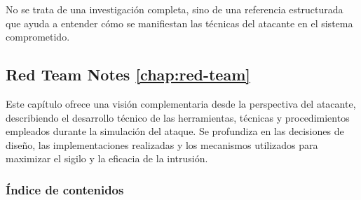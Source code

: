 No se trata de una investigación completa, sino de una referencia estructurada que ayuda a entender cómo se manifiestan las técnicas del atacante en el sistema comprometido.

\subsection{Red Team Notes \ref{chap:red-team}}
Este capítulo ofrece una visión complementaria desde la perspectiva del atacante, describiendo el desarrollo técnico de las herramientas, técnicas y procedimientos empleados durante la simulación del ataque. Se profundiza en las decisiones de diseño, las implementaciones realizadas y los mecanismos utilizados para maximizar el sigilo y la eficacia de la intrusión.

\subsubsection{Índice de contenidos}

